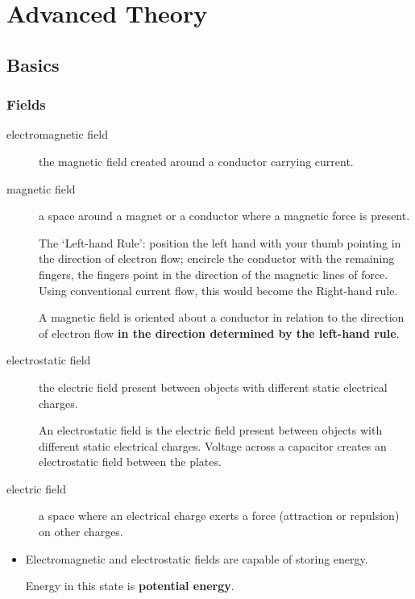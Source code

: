 \documentclass[letterpaper]{article}
\begin{document}
    \newpage

    
    \section{Advanced Theory}
        \subsection{Basics}
        \subsubsection{Fields}
        \begin{description}
            \item[electromagnetic field] the magnetic field created around a conductor carrying current.
            \item[magnetic field] a space around a magnet or a conductor where a magnetic force is present.

                The `Left-hand Rule':
                position the left hand with your thumb pointing in the direction of electron flow;
                encircle the conductor with the remaining fingers, the fingers point in the direction of the magnetic lines of force.
                Using conventional current flow, this would become the Right-hand rule.

                A magnetic field is oriented about a conductor in relation to the direction of electron flow \textbf{in the direction determined by the left-hand rule}.

            \item[electrostatic field] the electric field present between objects with different static electrical charges.

                An electrostatic field is the electric field present between objects with different static electrical charges.
                Voltage across a capacitor creates an electrostatic field between the plates.

            \item[electric field] a space where an electrical charge exerts a force (attraction or repulsion) on other charges.
        \end{description}

        \begin{itemize}
            \item Electromagnetic and electrostatic fields are capable of storing energy.

                Energy in this state is \textbf{potential energy}.
        \end{itemize}
\end{document}
